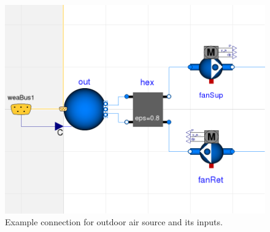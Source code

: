 \documentclass[10pt,a4paper]{article}
\begin{document}
\begin{figure}
\centering
\includegraphics[scale=0.4]{Example9_bus.png}
\caption{Example connection for outdoor air source and its inputs.}
\label{fig:bus}
\end{figure}
\end{document}
